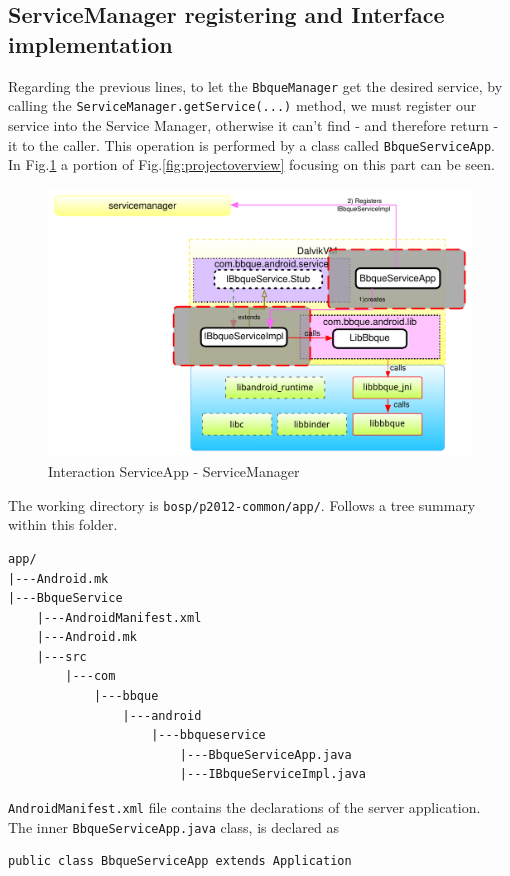 \subsection{ServiceManager registering and Interface implementation}
Regarding the previous lines, to let the \texttt{BbqueManager} get the desired service, by calling the \texttt{ServiceManager.getService(...)} method, we must register our service into the Service Manager, otherwise it can't find - and therefore return - it to the caller. This operation is performed by a class called \texttt{BbqueServiceApp}. In Fig.\ref{fig:projectoverview_serviceapp} a portion of Fig.\ref{fig:projectoverview} focusing on this part can be seen.
\begin{figure}[!htb]
	\centering
	\includegraphics[scale=.505]{images/project_overview_IServiceImpl.pdf}
	\caption{Interaction ServiceApp - ServiceManager}
	\label{fig:projectoverview_serviceapp}
\end{figure}
The working directory is \texttt{bosp/p2012-common/app/}. Follows a tree summary within this folder.
\begin{verbatim}
app/
|---Android.mk
|---BbqueService
    |---AndroidManifest.xml
    |---Android.mk
    |---src
        |---com
            |---bbque
                |---android
                    |---bbqueservice
                        |---BbqueServiceApp.java
                        |---IBbqueServiceImpl.java
\end{verbatim}
\texttt{AndroidManifest.xml} file contains the declarations of the server application.\\
The inner \texttt{BbqueServiceApp.java} class, is declared as
\begin{verbatim}
public class BbqueServiceApp extends Application
\end{verbatim}
